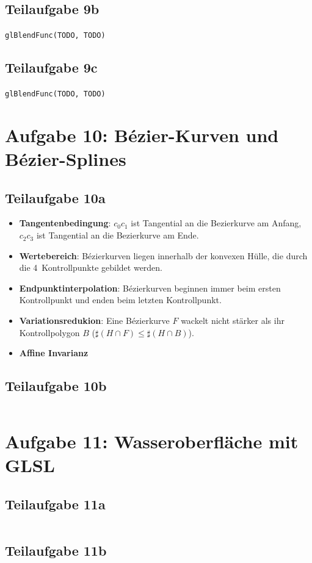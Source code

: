 \documentclass[a4paper]{scrartcl}
\begin{document}
\subsection*{Teilaufgabe 9b}
\texttt{glBlendFunc(TODO, TODO)}

\subsection*{Teilaufgabe 9c}
\texttt{glBlendFunc(TODO, TODO)}


\section*{Aufgabe 10: Bézier-Kurven und Bézier-Splines}
\subsection*{Teilaufgabe 10a}

\begin{itemize}
    \item \textbf{Tangentenbedingung}:
          $c_0 c_1$ ist Tangential an die Bezierkurve am Anfang,
          $c_2 c_3$ ist Tangential an die Bezierkurve am Ende.
    \item \textbf{Wertebereich}: Bézierkurven liegen innerhalb der konvexen
          Hülle, die durch die 4~Kontrollpunkte gebildet werden.
    \item \textbf{Endpunktinterpolation}: Bézierkurven beginnen immer beim
          ersten Kontrollpunkt und enden beim letzten Kontrollpunkt.
    \item \textbf{Variationsredukion}: Eine Bézierkurve $F$ wackelt nicht stärker
          als ihr Kontrollpolygon $B$ ($\sharp (H \cap F) \leq \sharp (H \cap B)$).
    \item \textbf{Affine Invarianz}
\end{itemize}

\clearpage
\subsection*{Teilaufgabe 10b}
\inputminted[linenos, numbersep=5pt, tabsize=4, frame=lines, label=shader.vert]{glsl}{shader.vert}

\clearpage
\section*{Aufgabe 11: Wasseroberfläche mit GLSL}
\subsection*{Teilaufgabe 11a}
\inputminted[linenos, numbersep=5pt, tabsize=4, frame=lines, label=shader.frag]{glsl}{shader.frag}

\clearpage
\subsection*{Teilaufgabe 11b}
\inputminted[linenos, numbersep=5pt, tabsize=4, frame=lines, label=shader.frag]{glsl}{shaderb.frag}
\end{document}
